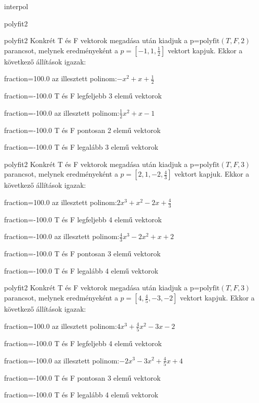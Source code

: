\documentclass[12pt]{article}
\begin{document}
\begin{quiz}{interpol}
\begin{multi}[multiple]{polyfit2}
\end{multi}
\begin{multi}[multiple]{polyfit2}
Konkrét T és F vektorok megadása után kiadjuk a p=$\mathrm{polyfit}(T,F,2)$
parancsot, melynek eredményeként a $p=\left[-1,1,\frac{1}{2}\right]$ vektort kapjuk.
Ekkor a következő állítások igazak:
\item[fraction=100.0] az illesztett polinom:$-x^2+x+\frac{1}{2}$
\item[fraction=-100.0]  T és F legfeljebb 3 elemű vektorok
\item[fraction=-100.0]  az illesztett polinom:$\frac{1}{2}x^2+x-1$
\item[fraction=-100.0]  T és F pontosan 2 elemű vektorok
\item[fraction=-100.0] T és F legalább 3 elemű vektorok
\end{multi}
\begin{multi}[multiple]{polyfit2}
Konkrét T és F vektorok megadása után kiadjuk a p=$\mathrm{polyfit}(T,F,3)$
parancsot, melynek eredményeként a $p=\left[2,1,-2,\frac{4}{3}\right]$ vektort kapjuk.
Ekkor a következő állítások igazak:
\item[fraction=100.0] az illesztett polinom:$2x^3+x^2-2x+\frac{4}{3}$
\item[fraction=-100.0]  T és F legfeljebb 4 elemű vektorok
\item[fraction=-100.0]  az illesztett polinom:$\frac{4}{3}x^3-2x^2+x+2$
\item[fraction=-100.0]  T és F pontosan 3 elemű vektorok
\item[fraction=-100.0] T és F legalább 4 elemű vektorok
\end{multi}
\begin{multi}[multiple]{polyfit2}
Konkrét T és F vektorok megadása után kiadjuk a p=$\mathrm{polyfit}(T,F,3)$
parancsot, melynek eredményeként a $p=\left[4,\frac{4}{5},-3,-2\right]$ vektort kapjuk.
Ekkor a következő állítások igazak:
\item[fraction=100.0] az illesztett polinom:$4x^3+\frac{4}{5}x^2-3x-2$
\item[fraction=-100.0]  T és F legfeljebb 4 elemű vektorok
\item[fraction=-100.0]  az illesztett polinom:$-2x^3-3x^2+\frac{4}{5}x+4$
\item[fraction=-100.0]  T és F pontosan 3 elemű vektorok
\item[fraction=-100.0] T és F legalább 4 elemű vektorok
\end{multi}
\end{quiz}
\end{document}
